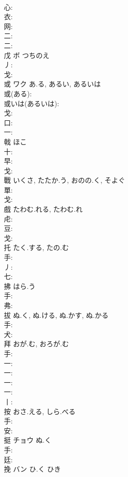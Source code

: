 \documentclass[8pt]{extreport}
\begin{document}
\begin{CJK}{UTF8}{min}
\\	心: 
\\	衣: 
\\	网: 
\\	二: 
\\	二: 
\\	戊	ボ	つちのえ		
\\	丿: 
\\	戈: 
\\	或	ワク	あ.る, あるい, あるいは		
\\	或(ある): 
\\	或いは(あるいは): 
\\	戈: 
\\	口: 
\\	一: 
\\	戟		ほこ				
\\	十: 
\\	早: 
\\	戈: 
\\	戰		いくさ, たたか.う, おのの.く, そよぐ				
\\	單: 
\\	戈: 
\\	戲		たわむ.れる, たわむ.れ				
\\	虍: 
\\	豆: 
\\	戈: 
\\	托		たく.する, たの.む				
\\	手: 
\\	丿: 
\\	七: 
\\	拂		はら.う				
\\	手: 
\\	弗: 
\\	拔		ぬ.く, ぬ.ける, ぬ.かす, ぬ.かる				
\\	手: 
\\	犬: 
\\	拜		おが.む, おろが.む				
\\	手: 
\\	一: 
\\	一: 
\\	一: 
\\	一: 
\\	丨: 
\\	按		おさ.える, しら.べる				
\\	手: 
\\	安: 
\\	挺	チョウ	ぬ.く		
\\	手: 
\\	廷: 
\\	挽	バン	ひ.く	ひき	

\end{CJK}
\end{document}
